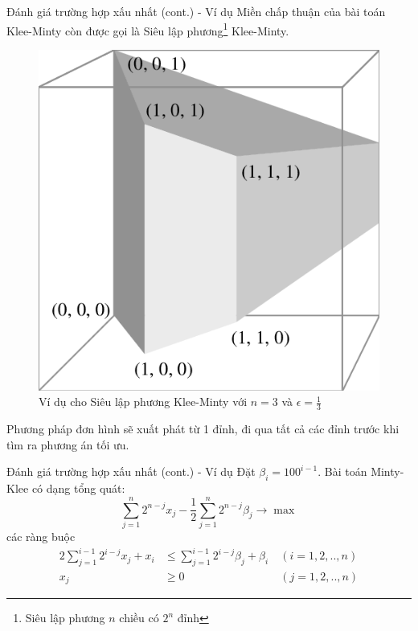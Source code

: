 \documentclass[10pt]{beamer}
\begin{document}
\begin{frame}{Đánh giá trường hợp xấu nhất (cont.) - Ví dụ}
Miền chấp thuận của bài toán Klee-Minty còn được gọi là Siêu lập phương\footnote{Siêu lập phương $n$ chiều có $2^n$ đỉnh\cite{10945-3852}} Klee-Minty.
\begin{figure}
\includegraphics[scale=.15]{img/klee-minty-cube.png}
\caption{Ví dụ cho Siêu lập phương Klee-Minty với $n = 3$ và $\epsilon = \frac{1}{3}$}
\end{figure}
Phương pháp đơn hình sẽ xuất phát từ 1 đỉnh, đi qua tất cả các đỉnh trước khi tìm ra phương án tối ưu.
\end{frame}

\begin{frame}{Đánh giá trường hợp xấu nhất (cont.) - Ví dụ}
Đặt $\beta_i = 100^{i - 1}$. Bài toán Minty-Klee có dạng tổng quát:
$$
\sum_{j = 1}^n 2^{n - j}x_j - \frac{1}{2}\sum_{j = 1}^n 2^{n - j}\beta_j \rightarrow \max
$$
các ràng buộc
$$
\begin{aligned}
2\sum_{j = 1}^{i - 1} 2^{i - j}x_j + x_i &\leq \sum_{j = 1}^{i - 1}2^{i - j}\beta_j + \beta_i\ &(i = 1, 2, .., n)\\
x_j &\geq 0 &(j = 1, 2, .., n)
\end{aligned}
$$
\end{frame}
\end{document}
